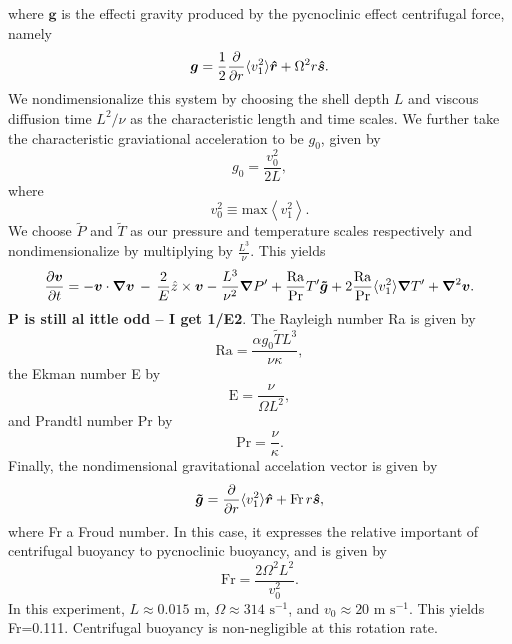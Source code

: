 where $\boldsymbol{g}$ is the effecti gravity produced by the pycnoclinic effect centrifugal force, namely
\begin{equation}
\boldsymbol{g} = \frac{1}{2}\frac{\partial}{\partial r}\langle v_1^2\rangle\boldsymbol{\hat{r}} + \Omega^2 r\boldsymbol{\boldsymbol{\hat{s}}}  .
\end{equation}
We nondimensionalize this system by choosing the shell depth $L$ and viscous diffusion time $L^2/\nu$ as the characteristic length and time scales.   We further take the characteristic graviational acceleration to be $g_0$, given by
\begin{equation}
g_0 = \frac{v_0^2}{2 L},
\end{equation}
where 
\begin{equation}
v_0^2 \equiv \mathrm{max}\left\langle v_1^2 \right\rangle.
\end{equation}
We choose $\tilde{P}$ and $\tilde{T}$ as our pressure and temperature scales respectively and
nondimensionalize by multiplying by $\frac{L^3}{\nu}$.  This yields
\begin{equation}
\frac{ \partial \vvec }{\partial t}   =  - \vvec\cdot\boldsymbol{\nabla}\vvec
\,-\, \frac{2}{E}{\hat{z}}\times\vvec  
-\frac{L^3}{\nu^2}\boldsymbol{\nabla}P'  %
						        + \frac{\mathrm{Ra}}{\mathrm{Pr}} T' \boldsymbol{\tilde{g}}
							+2\frac{\mathrm{Ra}}{\mathrm{Pr}}\langle v_1^2\rangle\boldsymbol{\nabla} T'
+ \boldsymbol{\nabla}^2\vvec.
\end{equation}
{\bf P is still al ittle odd -- I get 1/E2}.
The Rayleigh number Ra is given by
\begin{equation}
\mathrm{Ra} = \frac{\alpha g_0 \tilde{T} L^3}{\nu\kappa},
\end{equation}
the Ekman number E by
\begin{equation}
\mathrm{E} = \frac{\nu}{\Omega L^2},
\end{equation}
and Prandtl number Pr by
\begin{equation}
\mathrm{Pr} = \frac{\nu}{\kappa}.
\end{equation}
Finally, the nondimensional gravitational accelation vector is given by
\begin{equation}
\boldsymbol{\tilde{g}} = \frac{\partial}{\partial r}\langle v_1^2\rangle\boldsymbol{\hat{r}} + \mathrm{Fr}\, r\boldsymbol{\boldsymbol{\hat{s}}},
\end{equation}
where Fr a Froud number.  In this case, it expresses the relative important of centrifugal buoyancy to pycnoclinic buoyancy, and is given by
\begin{equation}
\mathrm{Fr} = \frac{2\Omega^2 L^2}{v_0^2}.
\end{equation} 
In this experiment, $L \approx 0.015$ m, $\Omega \approx 314 \,\,\mathrm{ s}^{-1}$, and $v_0 \approx 20 \,\,\mathrm{m}\,\,\mathrm{s}^{-1}$.  This yields Fr=0.111.  Centrifugal buoyancy is non-negligible at this rotation rate.
\clearpage


